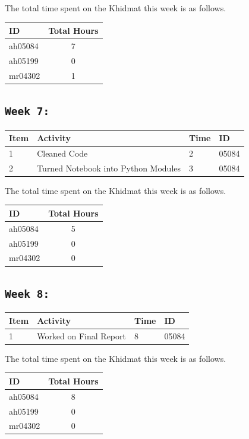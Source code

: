 \documentclass[11pt]{article}
\begin{document}
The total time spent on the Khidmat this week is as follows.    
\begin{center}
\begin{tabular}{|l|c|}
  \hline
  \textbf{ID} & \textbf{Total Hours}\\\hline
  ah05084 & 7 \\\hline
  ah05199 & 0 \\\hline
  mr04302 & 1 \\\hline
\end{tabular}
\end{center}
\newpage
\subsection{\texttt{Week 7: }}
\begin{center}
\begin{tabular}{|l|l|l|l|}
  \hline
  \textbf{Item} 	& \textbf{Activity} & \textbf{Time} & \textbf{ID} \\\hline
  1 & Cleaned Code & 2 & 05084 \\ \hline
  2 & Turned Notebook into Python Modules & 3 & 05084 \\ \hline
\end{tabular}
    
\end{center}
The total time spent on the Khidmat this week is as follows.    
\begin{center}
\begin{tabular}{|l|c|}
  \hline
  \textbf{ID} & \textbf{Total Hours}\\\hline
  ah05084 & 5 \\\hline
  ah05199 & 0 \\\hline
  mr04302 & 0 \\\hline
\end{tabular}
\end{center}
\newpage
\subsection{\texttt{Week 8: }}
\begin{center}
\begin{tabular}{|l|l|l|l|}
  \hline
  \textbf{Item} 	& \textbf{Activity} & \textbf{Time} & \textbf{ID} \\\hline
  1 & Worked on Final Report & 8 & 05084 \\ \hline
  
\end{tabular}
    
\end{center}
The total time spent on the Khidmat this week is as follows.    
\begin{center}
\begin{tabular}{|l|c|}
  \hline
  \textbf{ID} & \textbf{Total Hours}\\\hline
  ah05084 & 8 \\\hline
  ah05199 & 0 \\\hline
  mr04302 & 0 \\\hline
\end{tabular}
\end{center}
\newpage
\end{document}
